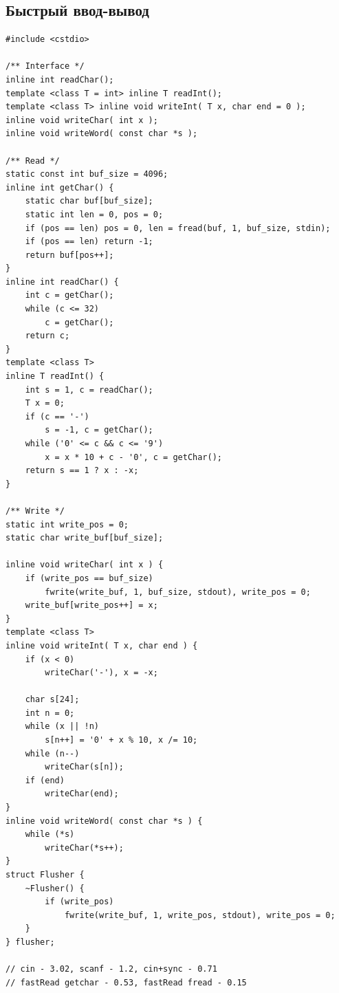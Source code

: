 \documentclass[10pt, portrait,letterpaper]{article}
\begin{document}
\subsection{Быстрый ввод-вывод}

\begin{verbatim}
#include <cstdio>

/** Interface */
inline int readChar();
template <class T = int> inline T readInt(); 
template <class T> inline void writeInt( T x, char end = 0 );
inline void writeChar( int x ); 
inline void writeWord( const char *s );

/** Read */
static const int buf_size = 4096;
inline int getChar() {
    static char buf[buf_size];
    static int len = 0, pos = 0;
    if (pos == len) pos = 0, len = fread(buf, 1, buf_size, stdin);
    if (pos == len) return -1;
    return buf[pos++];
}
inline int readChar() {
    int c = getChar();
    while (c <= 32)
        c = getChar();
    return c;
}
template <class T>
inline T readInt() {
    int s = 1, c = readChar();
    T x = 0;
    if (c == '-')
        s = -1, c = getChar();
    while ('0' <= c && c <= '9')
        x = x * 10 + c - '0', c = getChar();
    return s == 1 ? x : -x;
}

/** Write */
static int write_pos = 0;
static char write_buf[buf_size];

inline void writeChar( int x ) {
    if (write_pos == buf_size)
        fwrite(write_buf, 1, buf_size, stdout), write_pos = 0;
    write_buf[write_pos++] = x;
}
template <class T> 
inline void writeInt( T x, char end ) {
    if (x < 0)
        writeChar('-'), x = -x;

    char s[24];
    int n = 0;
    while (x || !n)
        s[n++] = '0' + x % 10, x /= 10;
    while (n--)
        writeChar(s[n]);
    if (end)
        writeChar(end);
}
inline void writeWord( const char *s ) {
    while (*s)
        writeChar(*s++);
}
struct Flusher {
    ~Flusher() {
        if (write_pos)
            fwrite(write_buf, 1, write_pos, stdout), write_pos = 0;
    }
} flusher;

// cin - 3.02, scanf - 1.2, cin+sync - 0.71
// fastRead getchar - 0.53, fastRead fread - 0.15
\end{verbatim}
\end{document}
